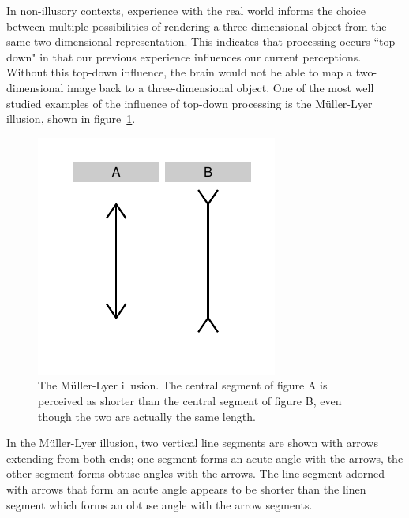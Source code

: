 \documentclass[11pt]{isuthesis}\usepackage[]{graphicx}\usepackage[]{color}
\begin{document}
In non-illusory contexts, experience with the real world informs the choice between multiple possibilities of rendering a three-dimensional object from the same two-dimensional representation. This indicates that processing occurs ``top down" in that our previous experience influences our current perceptions. Without this top-down influence, the brain would not be able to map a two-dimensional image back to a three-dimensional object. One of the most well studied examples of the influence of top-down processing is the M\"uller-Lyer illusion, shown in figure~\ref{fig:mullerlyer}.

\begin{figure}\centering
\includegraphics[keepaspectratio=TRUE, trim=0in .3in 0in .3in]{fig-mullerlyer}
\caption{The M\"uller-Lyer illusion. The central segment of figure A is perceived as shorter than the central segment  of figure B, even though the two are actually the same length.}
\label{fig:mullerlyer}
\end{figure}

In the M\"uller-Lyer illusion, two vertical line segments are shown with arrows extending from both ends; one segment forms an acute angle with the arrows, the other segment forms obtuse angles with the arrows. The line segment adorned with arrows that form an acute angle appears to be shorter than the linen segment which forms an obtuse angle with the arrow segments. 
\end{document}
